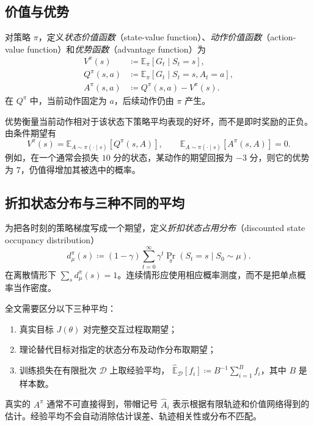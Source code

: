 \documentclass[UTF8,12pt,a4paper,fontset=fandol]{ctexart}
\begin{document}
\subsection{价值与优势}

\begin{definition}[价值函数与优势函数]
对策略 $\pi$，定义\emph{状态价值函数}（state-value function）、\emph{动作价值函数}（action-value function）和\emph{优势函数}（advantage function）为
\begin{align}
  V^\pi(s)&\coloneqq\mathbb E_\pi[G_t\mid S_t=s],\\
  Q^\pi(s,a)&\coloneqq\mathbb E_\pi[G_t\mid S_t=s,A_t=a],\\
  A^\pi(s,a)&\coloneqq Q^\pi(s,a)-V^\pi(s).
  \label{eq:ppo-advantage}
\end{align}
在 $Q^\pi$ 中，当前动作固定为 $a$，后续动作仍由 $\pi$ 产生。
\end{definition}

优势衡量当前动作相对于该状态下策略平均表现的好坏，而不是即时奖励的正负。由条件期望有
\begin{equation}
  V^\pi(s)=\mathbb E_{A\sim\pi(\cdot\mid s)}[Q^\pi(s,A)],
  \qquad
  \mathbb E_{A\sim\pi(\cdot\mid s)}[A^\pi(s,A)]=0.
  \label{eq:ppo-zero-mean-advantage}
\end{equation}
例如，在一个通常会损失 $10$ 分的状态，某动作的期望回报为 $-3$ 分，则它的优势为 $7$，仍值得增加其被选中的概率。

\subsection{折扣状态分布与三种不同的平均}

为把各时刻的策略梯度写成一个期望，定义\emph{折扣状态占用分布}（discounted state occupancy distribution）
\begin{equation}
  d^\pi_\mu(s)
  \coloneqq(1-\gamma)\sum_{t=0}^{\infty}
  \gamma^t\Pr_\pi(S_t=s\mid S_0\sim\mu).
  \label{eq:ppo-occupancy}
\end{equation}
在离散情形下 $\sum_s d^\pi_\mu(s)=1$。连续情形应使用相应概率测度，而不是把单点概率当作密度。

全文需要区分以下三种平均：
\begin{enumerate}
  \item 真实目标 $J(\theta)$ 对完整交互过程取期望；
  \item 理论替代目标对指定的状态分布及动作分布取期望；
  \item 训练损失在有限批次 $\mathcal D$ 上取经验平均，
  $\widehat{\mathbb E}_{\mathcal D}[f_i]\coloneqq B^{-1}\sum_{i=1}^B f_i$，其中 $B$ 是样本数。
\end{enumerate}
真实的 $A^\pi$ 通常不可直接得到，带帽记号 $\widehat A_i$ 表示根据有限轨迹和价值网络得到的估计。经验平均不会自动消除估计误差、轨迹相关性或分布不匹配。
\end{document}
